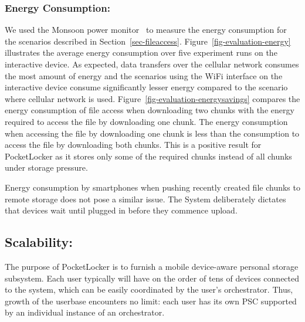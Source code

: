 \subsubsection{Energy Consumption:\space}We used the Monsoon power
monitor~\cite{monsoon} to measure the energy consumption
for the scenarios described in Section~\ref{sec-fileaccess}.
Figure~\ref{fig-evaluation-energy} illustrates the average energy consumption
over five experiment runs on the
interactive device. As expected, data transfers over the cellular network
consumes the most amount of energy and the scenarios using the WiFi interface on
the interactive device consume significantly lesser energy compared to the
scenario where cellular network is used. Figure~\ref{fig-evaluation-energysavings}
compares the energy consumption of file access when downloading two chunks
with the energy required to access the file by downloading one chunk. The
energy consumption when accessing the file by downloading one
chunk is less than the consumption to access the file by downloading both
chunks. This is a positive result for PocketLocker as it stores only some of
the required chunks instead of all chunks under storage pressure.

Energy consumption by smartphones when pushing recently created file chunks to
remote storage does not pose a similar issue.  The System deliberately dictates
that devices wait until plugged in before they commence upload.

\subsection{Scalability:\space} The purpose of PocketLocker is to furnish a
mobile device-aware personal storage subsystem. Each user typically will have
on the order of tens of devices connected to the system, which can be easily
coordinated by the user's orchestrator. Thus, growth of the userbase encounters
no limit: each user has its own PSC supported by an individual instance of an
orchestrator.


